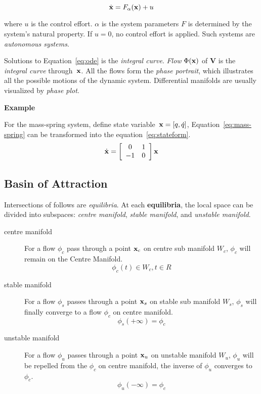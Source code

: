 \begin{equation}
\label{eq:ode}
\dot{\mathbf{x}}=F_{\alpha}(\mathbf{x})+u
\end{equation}



where $u$ is the control effort. 
$\alpha$ is the system parameters
$F$ is determined by the system's natural property.
If $u=0$,  no control effort is applied.
Such systems are \emph{autonomous systems}. 

Solutions to Equation~\ref{eq:ode} is the \emph{integral curve}. 
\emph{Flow} $\Phi(\mathbf{x})$ of $\mathbf{V}$ is the \emph{integral curve} through~$\mathbf{x}$. 
All the flows form the \emph{phase portrait}, which illustrates all the possible motions of the dynamic system.
Differential manifolds are usually visualized by \emph{phase plot}.

\textbf{Example}

For the mass-spring system, define state variable~$\mathbf{x}=[q,\dot{q}]$, Equation~\ref{eq:mass-spring} can be transformed into the equation~\ref{eq:stateform}.
\begin{equation}
\label{eq:stateform}
\dot{\mathbf{x}}=
\left[ 
\begin{array}{cc}
0 &1\\
-1 &0 
\end{array}
\right]\mathbf{x}
\end{equation}



\subsection{Basin of Attraction}
Intersections of follows are \emph{equilibria}.
At each \textbf{equilibria}, the local space can be divided into subspaces: 
\emph{centre manifold}, \emph{stable manifold}, and \emph{unstable manifold}.
\begin{description} 
\item[centre manifold]
For a flow $\phi_c$ pass through a point $\mathbf{x}_{c}$ on centre sub manifold $W_{c}$, $\phi_c$ will remain on the Centre Manifold. 
\[
\phi_{c}(t) \in W_{c}, t \in R
\]

\item [stable manifold]
For a flow $\phi_{s}$ passes through a point $\mathbf{x}_{s}$ on stable sub manifold $W_{s}$, $\phi_s$ will finally converge to a flow $\phi_c$ on centre manifold.
\[
\phi_{s}(+\infty)=\phi_{c}
\]
\item[unstable manifold]
For a flow $\phi_u$ passes through a point $\mathbf{x}_u$ on unstable manifold $W_{u}$, $\phi_u$ will be repelled from the $\phi_c$ on centre manifold, the inverse of $\phi_u$ converges to $\phi_c$. 
\[
\phi_{u}(-\infty)=\phi_{c}
\] 
\end{description}



